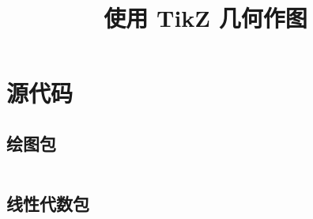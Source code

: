 \documentclass[a4paper, titlepage, 12pt]{ctexbook}
\title{\Huge{\textbf{使用 TikZ 几何作图}}}
\begin{document}
\raggedbottom 

\frontmatter

\maketitle

\tableofcontents

\mainmatter





\appendix






\chapter{源代码}

\section{绘图包}
\inputminted{latex}{../tikzlibraryeuclidea.code.tex}

\section{线性代数包}
\inputminted{latex}{../tikzlibrarymc.code.tex}

\backmatter

\cleardoublepage
{}



\end{document}
